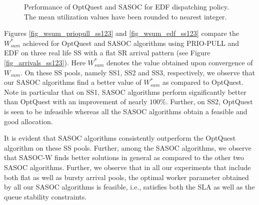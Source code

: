 \documentclass[11pt,letterpaper,english]{article}
\begin{document}
\begin{figure}
    \centering
{}
\label{fig:mean-util}
\caption{Performance of OptQuest and SASOC for EDF dispatching policy. The mean utilization values have been rounded to nearest integer.}
\end{figure}

Figures \ref{fig_wsum_priopull_ss123} and \ref{fig_wsum_edf_ss123} compare the
$W^*_{sum}$ achieved for OptQuest and SASOC algorithms using PRIO-PULL
and EDF on three real life SS with a flat SR arrival pattern (see Figure \ref{fig_arrivals_ss123}). 
Here $W^*_{sum}$ denotes the value
obtained upon convergence of $W_{sum}$. On these SS pools, namely
SS1, SS2 and SS3, respectively, we observe that our SASOC algorithms
find a better value of $W^*_{sum}$ as compared to OptQuest.
Note in particular that on SS1, SASOC algorithms perform significantly better than OptQuest with an improvement of nearly $100\%$.
Further, on SS2, OptQuest is seen to be infeasible whereas all the
SASOC algorithms obtain a feasible and good allocation.

It is evident that SASOC algorithms consistently outperform the OptQuest algorithm on these SS pools.
Further, among the SASOC algorithms, we observe that SASOC-W finds
better solutions in general as compared to the other two SASOC
algorithms. Further, we observe that in all our experiments that include both flat as well as bursty arrival pools, the optimal worker parameter obtained by all our SASOC algorithms is feasible, i.e., satisfies both the SLA as well as the queue stability constraints.
\end{document}
